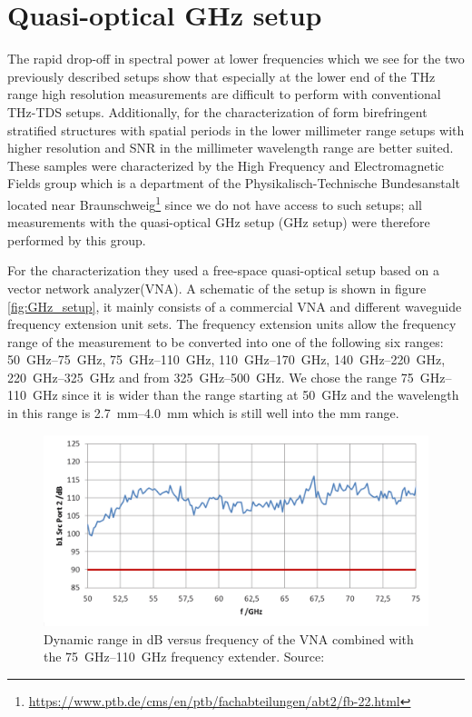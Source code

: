 \section{Quasi-optical GHz setup}
\label{sec:GHz_setup}
The rapid drop-off in spectral power at lower frequencies which we see for the two previously described setups show that especially at the lower end of the THz range high resolution measurements are difficult to perform with conventional THz-TDS setups. Additionally, for the characterization of form birefringent stratified structures with spatial periods in the lower millimeter range setups with higher resolution and SNR in the millimeter wavelength range are better suited. These samples were characterized by the High Frequency and Electromagnetic Fields group which is a department of the Physikalisch-Technische Bundesanstalt located near Braunschweig\footnote{\url{https://www.ptb.de/cms/en/ptb/fachabteilungen/abt2/fb-22.html}} since we do not have access to such setups; all measurements with the quasi-optical GHz setup (GHz setup) were therefore performed by this group.

For the characterization they used a free-space quasi-optical setup based on a vector network analyzer(VNA). A schematic of the setup is shown in figure \ref{fig:GHz_setup}, it mainly consists of a commercial VNA and different waveguide frequency extension unit sets. The frequency extension units allow the frequency range of the measurement to be converted into one of the following six ranges: \SIrange[range-phrase=--]{50}{75}{\giga \hertz}, \SIrange[range-phrase=--]{75}{110}{\giga \hertz}, \SIrange[range-phrase=--]{110}{170}{\giga \hertz}, \SIrange[range-phrase=--]{140}{220}{\giga \hertz}, \SIrange[range-phrase=--]{220}{325}{\giga \hertz} and from \SIrange{325}{500}{\giga \hertz}. We chose the range \SIrange{75}{110}{\giga \hertz} since it is wider than the range starting at \SI{50}{\giga \hertz} and the wavelength in this range is \SIrange{2.7}{4.0}{\milli \meter} which is still well into the \si{\milli \meter} range. 

\begin{figure}[H]
    \centering
    \includegraphics[scale=0.4]{images/3_chapter03/DNR.png}
    \caption{Dynamic range in dB versus frequency of the VNA combined with the \SIrange[range-phrase=--]{75}{110}{\giga \hertz} frequency extender. Source: \cite{VNADNR2013}}
    \label{fig:VNA_DNR}
\end{figure}

